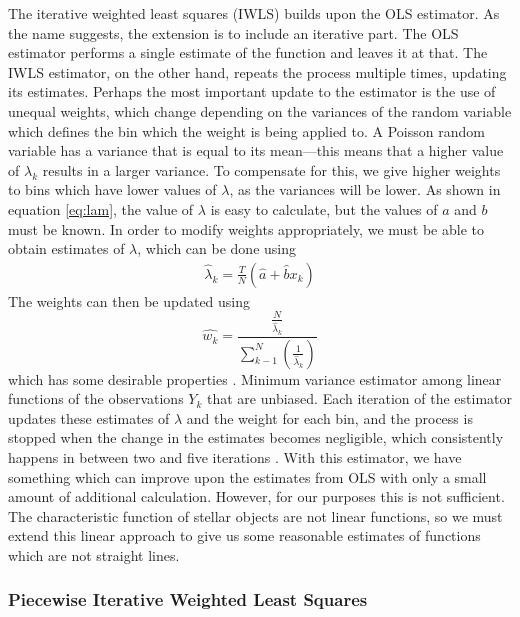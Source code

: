 \documentclass[a4paper,11pt]{article}
\begin{document}
The iterative weighted least squares (IWLS) builds upon the OLS estimator. As
the name suggests, the extension is to include an iterative part. The OLS
estimator performs a single estimate of the function and leaves it at that. The
IWLS estimator, on the other hand, repeats the process multiple times, updating
its estimates. Perhaps the most important update to the estimator is the use of
unequal weights, which change depending on the variances of the random variable
which defines the bin which the weight is being applied to. A Poisson
random variable has a variance that is equal to its mean---this means that a
higher value of ${\lambda}_k$ results in a larger variance. To compensate for
this, we give higher weights to bins which have lower values of $\lambda$, as
the variances will be lower. As shown in equation \eqref{eq:lam}, the value of
$\lambda$ is easy to calculate, but the values of $a$ and $b$ must be known. In
order to modify weights appropriately, we must be able to obtain estimates of
$\lambda$, which can be done using \cite{massey1996estimating}
\begin{align}
\hat{\lambda}_k=\frac{T}{N}(\hat{a}+\hat{b}x_k)
\end{align}
The weights can then be updated using
\begin{equation}
\hat{w_k}=\frac{\displaystyle \frac{N}{\hat{\lambda}_k}}{\displaystyle \sum_{k-1}^N\left(\frac{1}{\hat{\lambda}_k}\right)}
\end{equation}
which has some desirable properties \cite{massey1996estimating}. Minimum
variance estimator among linear functions of the observations $Y_k$ that are
unbiased. Each iteration of the estimator updates these estimates of $\lambda$
and the weight for each bin, and the process is stopped when the change in the
estimates becomes negligible, which consistently happens in between two and five
iterations \cite{massey1996estimating}. With this estimator, we have something
which can improve upon the estimates from OLS with only a small amount of
additional calculation. However, for our purposes this is not sufficient. The
characteristic function of stellar objects are not linear functions, so we must
extend this linear approach to give us some reasonable estimates of functions
which are not straight lines.
\subsubsection{Piecewise Iterative Weighted Least Squares}
\label{sec-5-1-3}
\end{document}
